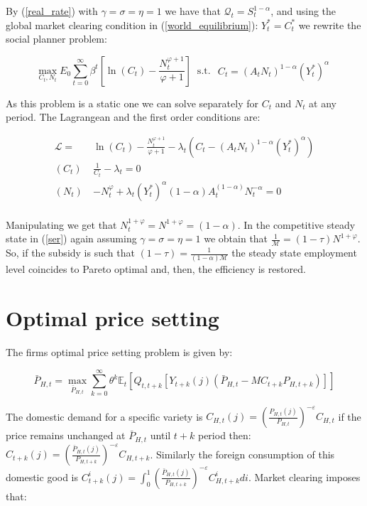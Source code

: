 \documentclass{article}
\newcommand{\Et}{\mathbb{E}_t}
\begin{document}
By (\ref{real_rate}) with $\gamma = \sigma = \eta = 1$ we have that $\mathcal{Q}_t = S_t^{1-\alpha}$, and using the global market clearing condition in (\ref{world_equilibrium}): $Y_t^* = C_t^*$ we rewrite the social planner problem:

$$\max_{C_t, N_t} E_0 \sum^\infty_{t=0} \beta^t \left[\ln(C_t) - \frac{N_t^{\varphi+1}}{\varphi+1} \right] \ \textrm{ s.t. } \begin{matrix}
    C_t = (A_t N_t)^{1-\alpha}(Y_t^*)^\alpha
\end{matrix}$$

As this problem is a static one we can solve separately for $C_t$ and $N_t$ at any period. The Lagrangean and the first order conditions are:

\begin{equation*}
    \begin{split}
        \mathcal L = & \ln(C_t) - \frac{N_t^{\varphi+1}}{\varphi+1} - \lambda_t(C_t - (A_t N_t)^{1-\alpha}(Y_t^*)^\alpha) \\
        (C_t) \ & \frac{1}{C_t} - \lambda_t = 0\\
        (N_t) \ & -N_t^\varphi + \lambda_t (Y_t^*)^\alpha (1 - \alpha) A_t^{(1 - \alpha)}N_t^{-\alpha} = 0\\
    \end{split}
\end{equation*}

Manipulating we get that $N_t^{1+\varphi} = N^{1+\varphi} = (1-\alpha)$. In the competitive steady state in (\ref{ser}) again assuming $\gamma = \sigma = \eta = 1$ we obtain that $\frac{1}{\mathcal M} = (1-\tau) N^{1+\varphi}$. So, if the subsidy is such that $(1-\tau) = \frac{1}{(1-\alpha) \mathcal M}$ the steady state employment level coincides to Pareto optimal and, then, the efficiency is restored.

\section{Optimal price setting}
The firms optimal price setting problem is given by:

\begin{equation}
    \bar P_{H,t} = \max_{\bar P_{H,t}} \sum^\infty_{k=0} \theta^k \Et \left[ Q_{t, t+k}[Y_{t+k}(j) (\bar P_{H,t} - MC_{t+k} P_{H,t+k})] \right]
\end{equation}

The domestic demand for a specific variety is $C_{H,t}(j) = \left( \frac{P_{H,t}(j)}{P_{H,t}} \right)^{-\varepsilon} C_{H, t}$ if the price remains unchanged at $\bar P_{H,t}$ until $t+k$ period then: $C_{t+k}(j) = \left( \frac{\bar P_{H,t}(j)}{P_{H,t+k}}\right)^{-\varepsilon} C_{H, t+k}$. Similarly the foreign consumption of this domestic good is $C^i_{t+k}(j) = \int^1_0 \left( \frac{\bar P_{H,t}(j)}{P_{H,t+k}} \right)^{-\varepsilon} C^i_{H, t+k} di$. Market clearing imposes that:
\end{document}
